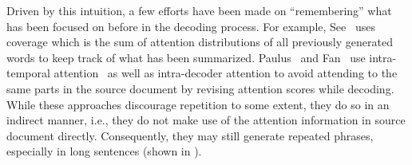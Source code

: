 Driven by this intuition, a few efforts have been made on ``remembering''
what has been focused on before in the decoding process. 
For example, See~  
uses coverage which is the sum of
attention distributions of all previously generated words to keep track of 
what has been summarized.  Paulus~ and 
Fan~ use intra-temporal 
attention~\cite{NallapatiZSGX16} as well as intra-decoder attention to avoid 
attending to the same parts in the source document by 
revising attention scores while decoding. 
While these approaches discourage repetition to some extent,
they do so in an indirect manner, i.e., they do not 
make use of the attention information in source document directly.
Consequently, they may still generate repeated phrases, 
especially in long sentences (shown in ).

